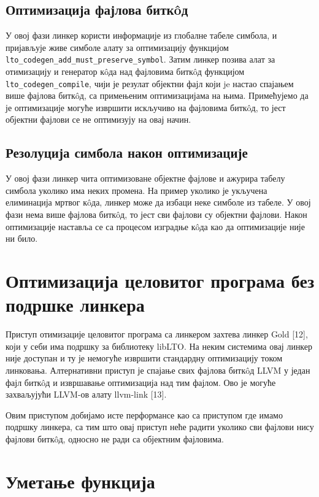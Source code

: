 \documentclass[12pt,oneside]{memoir}
\begin{document}
\subsection{Оптимизација фајлова битк\^{o}д} 
У овој фази линкер користи информације из глобалне табеле симбола, и пријављује
живе симболе алату за оптимизацију функцијом \\
\texttt{lto{\_}codegen{\_}add{\_}must{\_}preserve{\_}symbol}.
Затим линкер позива алат за отимизацију и генератор к\^{o}да над фајловима битк\^{o}д
функцијом \texttt{lto{\_}codegen{\_}compile}, чији је резулат објектни фајл
који je настао спајањем више фајлова битк\^{o}д, са примењеним оптимизацијама на њима.
Примећујемо да је оптимизације могуће извршити искључиво на фајловима битк\^{o}д,
то јест објектни фајлови се не оптимизују на овај начин.

\subsection{Резолуција симбола након оптимизације}
У овој фази линкер чита оптимизоване објектне фајлове и ажурира табелу симбола уколико 
има неких промена. На пример уколико је укључена елиминација мртвог к\^{o}да,
линкер може да избаци неке симболе из табеле.
У овој фази нема више фајлова битк\^{o}д, то јест сви фајлови су објектни фајлови.
Након оптимизације наставља се са процесом изградње к\^{o}да као да оптимизације
није ни било.

\section{Оптимизација целовитог програма без подршке линкера}

Приступ отимизације целовитог програма са линкером захтева линкер Gold [12],
који у себи има подршку за библиотеку libLTO.
На неким системима овај линкер није доступан и ту је немогуће извршити стандардну
оптимизацију током линковања.
Алтернативни приступ је спајање свих фајлова битк\^{o}д LLVM  у један фајл битк\^{o}д
и извршавање оптимизација над тим фајлом.
Ово је могуће захваљујући LLVM-ов алату llvm-link [13].

Овим приступом добијамо исте перформансе као са приступом где имамо подршку линкера,
са тим што овај приступ неће радити уколико сви фајлови нису фајлови битк\^{o}д,
односно не ради са објектним фајловима.


\section{Уметање функција}
\end{document}
